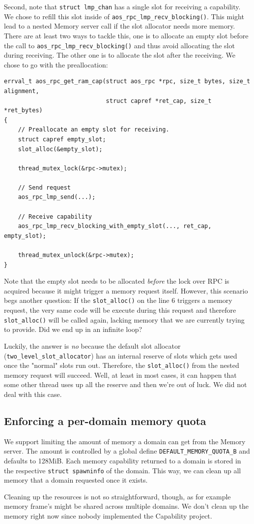Second, note that \texttt{struct lmp_chan} has a single slot for receiving a capability. We chose to refill this slot inside of \texttt{aos_rpc_lmp_recv_blocking()}. This might lead to a nested Memory server call if the slot allocator needs more memory. There are at least two ways to tackle this, one is to allocate an empty slot before the call to \texttt{aos_rpc_lmp_recv_blocking()} and thus avoid allocating the slot during receiving. The other one is to allocate the slot after the receiving. We chose to go with the preallocation:
\begin{verbatim}
errval_t aos_rpc_get_ram_cap(struct aos_rpc *rpc, size_t bytes, size_t alignment,
                             struct capref *ret_cap, size_t *ret_bytes)
{
    // Preallocate an empty slot for receiving.
    struct capref empty_slot;
    slot_alloc(&empty_slot);
    
    thread_mutex_lock(&rpc->mutex);
    
    // Send request
    aos_rpc_lmp_send(...);
    
    // Receive capability
    aos_rpc_lmp_recv_blocking_with_empty_slot(..., ret_cap, empty_slot);
    
    thread_mutex_unlock(&rpc->mutex);
}
\end{verbatim}

Note that the empty slot needs to be allocated \emph{before} the lock over RPC is acquired because it might trigger a memory request itself. However, this scenario begs another question: If the  \texttt{slot_alloc()} on the line 6 triggers a memory request, the very same code will be execute during this request and therefore \texttt{slot_alloc()} will be called again, lacking memory that we are currently trying to provide. Did we end up in an infinite loop?

Luckily, the answer is \emph{no} because the default slot allocator (\texttt{two_level_slot_allocator}) has an internal reserve of slots which gets used once the "normal" slots run out. Therefore, the \texttt{slot_alloc()} from the nested memory request will succeed. Well, at least in most cases, it can happen that some other thread uses up all the reserve and then we're out of luck. We did not deal with this case.

\subsection{Enforcing a per-domain memory quota}
\label{sec:mem_qouta} 

We support limiting the amount of memory a domain can get from the Memory server. The amount is controlled by a global define \texttt{DEFAULT_MEMORY_QUOTA_B} and defaults to 128MiB. Each memory capability returned to a domain is stored in the respective \texttt{struct spawninfo} of the domain. This way, we can clean up all memory that a domain requested once it exists.

Cleaning up the resources is not so straightforward, though, as for example memory frame's might be shared across multiple domains. We don't clean up the memory right now since nobody implemented the Capability project.